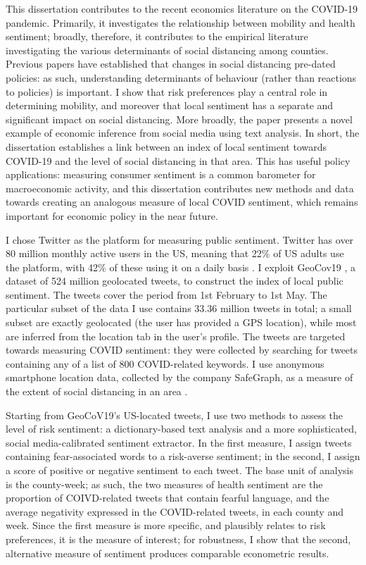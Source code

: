 \documentclass{article}
\begin{document}
This dissertation contributes to the recent economics literature on the COVID-19 pandemic. Primarily, it investigates the relationship between mobility and health sentiment; broadly, therefore, it contributes to the empirical literature investigating the various determinants of social distancing among counties. Previous papers have established that changes in social distancing pre-dated policies: as such, understanding determinants of behaviour (rather than reactions to policies) is important. I show that risk preferences play a central role in determining mobility, and moreover that local sentiment has a separate and significant impact on social distancing. More broadly, the paper presents a novel example of economic inference from social media using text analysis. In short, the dissertation establishes a link between an index of local sentiment towards COVID-19 and the level of social distancing in that area. This has useful policy applications: measuring consumer sentiment is a common barometer for macroeconomic activity, and this dissertation contributes new methods and data towards creating an analogous measure of local COVID sentiment, which remains important for economic policy in the near future.

I chose Twitter as the platform for measuring public sentiment. Twitter has over 80 million monthly active users in the US, meaning that 22\% of US adults use the platform, with 42\% of these using it on a daily basis \parencite{perrinShareAdultsUsing2019}. I exploit GeoCov19 \parencite{qaziGeoCoV19DatasetHundreds2020a}, a dataset of 524 million geolocated tweets, to construct the index of local public sentiment. The tweets cover the period from 1st February to 1st May. The particular subset of the data I use contains 33.36 million tweets in total; a small subset are exactly geolocated (the user has provided a GPS location), while most are inferred from the location tab in the user's profile. The tweets are targeted towards measuring COVID sentiment: they were collected by searching for tweets containing any of a list of 800 COVID-related keywords. I use anonymous smartphone location data, collected by the company SafeGraph, as a measure of the extent of social distancing in an area \parencite{safegraphinc.SocialDistancingMetrics2020}.

Starting from GeoCoV19's US-located tweets, I use two methods to assess the level of risk sentiment: a dictionary-based text analysis and a more sophisticated, social media-calibrated sentiment extractor. In the first measure, I assign tweets containing fear-associated words to a risk-averse sentiment; in the second, I assign a score of positive or negative sentiment to each tweet. The base unit of analysis is the county-week; as such, the two measures of health sentiment are the proportion of COIVD-related tweets that contain fearful language, and the average negativity expressed in the COVID-related tweets, in each county and week. Since the first measure is more specific, and plausibly relates to risk preferences, it is the measure of interest; for robustness, I show that the second, alternative measure of sentiment produces comparable econometric results.
\end{document}
